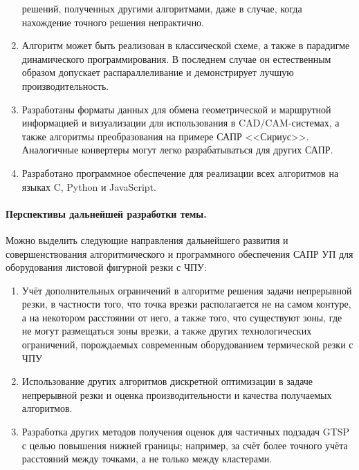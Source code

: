 \begin{enumerate}
    решений, полученных другими алгоритмами,
    даже в случае, когда нахождение точного решения непрактично.
    \item 
    Алгоритм может быть реализован в классической схеме,
    а также в парадигме динамического программирования. 
    В последнем случае он естественным образом допускает
    распараллеливание и демонстрирует лучшую производительность.
    \item 
    Разработаны форматы данных для обмена геометрической и маршрутной 
    информацией и визуализации для использования в CAD/CAM-системах, 
    а также алгоритмы преобразования на примере САПР <<Сириус>>.
    Аналогичные конвертеры могут легко разрабатываться для других САПР.
    \item 
    Разработано программное обеспечение для реализации всех алгоритмов
    на языках C, Python и JavaScript.
\end{enumerate}

\paragraph*{Перспективы дальнейшей разработки темы.}
Можно выделить следующие направления дальнейшего развития и совершенствования алгоритмического и
программного обеспечения САПР УП для оборудования листовой фигурной резки с ЧПУ:

\begin{enumerate}
    \item 
    Учёт дополнительных ограничений в алгоритме решения задачи
    непрерывной резки, в частности того, 
    что точка врезки располагается не на самом контуре,
    а на некотором расстоянии от него, а также того, что
    существуют зоны, где не могут размещаться зоны врезки,
    а также других технологических ограничений,
    порождаемых современным оборудованием термической резки с ЧПУ
    \item 
    Использование других алгоритмов дискретной оптимизации в задаче
    непрерывной резки и оценка производительности и качества получаемых 
    алгоритмов.
    \item 
    Разработка других методов получения оценок для частичных подзадач GTSP
    с целью повышения нижней границы; 
    например, за счёт более точного учёта расстояний между точками,
    а не только между кластерами.
\end{enumerate}

